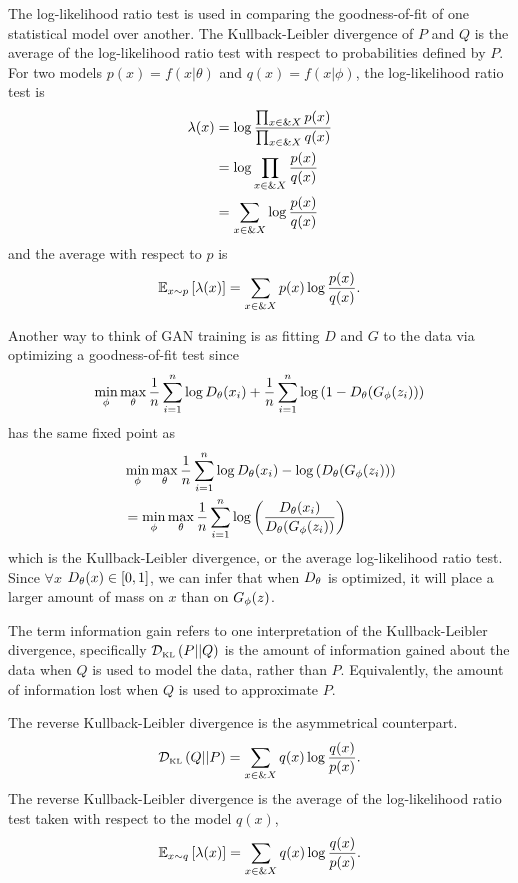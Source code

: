 \begin{remark}
  The log-likelihood ratio test is used in comparing the
  goodness-of-fit of one statistical model over another.  The
  Kullback-Leibler divergence of $P$ and $Q$ is the average of the
  log-likelihood ratio test with respect to probabilities defined by
  $P$.  For two models $p(x) = f(x|\theta)$ and $q(x) = f(x|\phi)$,
  the log-likelihood ratio test is
  \begin{align}
    \lambda(x) & = \log{\prod_{x \in \&X} p(x) \over \prod_{x \in \&X} q(x)} \\
               & = \log \prod_{x \in \&X} {p(x) \over q(x)} \\
               & = \sum_{x \in \&X} \log {p(x) \over q(x)}
  \end{align}
  and the average with respect to $p$ is
  \begin{align}
    \mathbb{E}_{x \sim p}\left[ \lambda(x) \right] = \sum_{x \in \&X} p(x)\log {p(x) \over q(x)}.
  \end{align}
\end{remark}

Another way to think of GAN training is as fitting $D$ and $G$ to the
data via optimizing a goodness-of-fit test since
\begin{align}
  \min_\phi\max_\theta{1 \over n} \sum_{i=1}^n \log{D_\theta(x_i)} + {1
    \over n} \sum_{i=1}^n\log{(1 - D_\theta(G_\phi(z_i)))}
\end{align}
has the same fixed point as
\begin{align}
  & \min_\phi\max_\theta{1 \over n} \sum_{i=1}^n \log{D_\theta(x_i)} - \log{(D_\theta(G_\phi(z_i)))} \\
  & = \min_\phi\max_\theta{1 \over n} \sum_{i=1}^n \log{\left({D_\theta(x_i) \over D_\theta(G_\phi(z_i))}\right)}
\end{align}
which is the Kullback-Leibler divergence, or the average
log-likelihood ratio test. Since $\forall x$ $D_\theta(x) \in [0, 1]$, we
can infer that when $D_\theta$ is optimized, it will place a larger amount
of mass on $x$ than on $G_\phi(z)$.

The term information gain refers to one interpretation of the
Kullback-Leibler divergence, specifically $\mathcal{D}_{\text{\tiny KL}}\left( P \middle| \middle| Q \right)$ is the amount of
information gained about the data when $Q$ is used to model the data,
rather than $P$.  Equivalently, the amount of information lost when
$Q$ is used to approximate $P$.

\begin{definition}
  The \textnormal{\sffamily reverse Kullback-Leibler divergence} is the asymmetrical
  counterpart.
  \begin{align}
    \label{eq:reverse-KL}
    \mathcal{D}_{\text{\tiny KL}}\left( Q \middle| \middle| P \right) = \sum_{x \in \&X} q(x) \log{q(x) \over p(x)}.
  \end{align}
  The reverse Kullback-Leibler divergence is the average of the log-likelihood
  ratio test taken with respect to the model $q(x)$,
  \begin{align}
    \mathbb{E}_{x \sim q}\left[ \lambda(x) \right] = \sum_{x \in \&X} q(x)\log {q(x) \over p(x)}.
  \end{align}
\end{definition}


